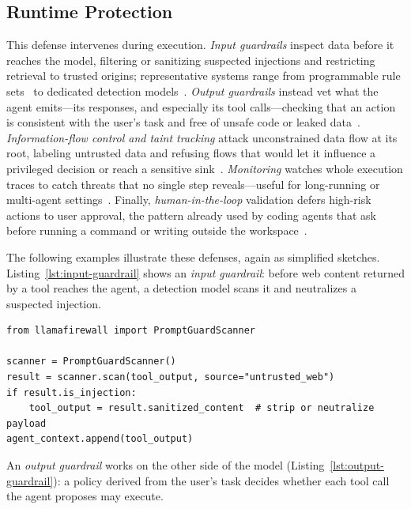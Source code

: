 \subsection{Runtime Protection}

This defense intervenes during execution. \emph{Input guardrails} inspect data before it reaches the model, filtering or sanitizing suspected injections and restricting retrieval to trusted origins; representative systems range from programmable rule sets~\cite{rebedea2023nemo} to dedicated detection models~\cite{llamafirewall,datasentinel}. \emph{Output guardrails} instead vet what the agent emits—its responses, and especially its tool calls—checking that an action is consistent with the user's task and free of unsafe code or leaked data~\cite{shi2025progent,xiang2024guardagent,codeshield}. \emph{Information-flow control and taint tracking} attack unconstrained data flow at its root, labeling untrusted data and refusing flows that would let it influence a privileged decision or reach a sensitive sink~\cite{debenedetti2025camel,costa2025fides,zhu2025melon}. \emph{Monitoring} watches whole execution traces to catch threats that no single step reveals—useful for long-running or multi-agent settings~\cite{kim2026sok}. Finally, \emph{human-in-the-loop} validation defers high-risk actions to user approval, the pattern already used by coding agents that ask before running a command or writing outside the workspace~\cite{github-copilot,cursor}.

The following examples illustrate these defenses, again as simplified sketches. Listing~\ref{lst:input-guardrail} shows an \emph{input guardrail}: before web content returned by a tool reaches the agent, a detection model scans it and neutralizes a suspected injection.

\begin{lstlisting}[caption={Input guardrails: a dedicated detection model, in the style of LlamaFirewall/DataSentinel~\cite{llamafirewall,datasentinel}, scoring content before it enters context.}, label={lst:input-guardrail}]
from llamafirewall import PromptGuardScanner

scanner = PromptGuardScanner()
result = scanner.scan(tool_output, source="untrusted_web")
if result.is_injection:
    tool_output = result.sanitized_content  # strip or neutralize payload
agent_context.append(tool_output)
\end{lstlisting}

An \emph{output guardrail} works on the other side of the model (Listing~\ref{lst:output-guardrail}): a policy derived from the user's task decides whether each tool call the agent proposes may execute.

